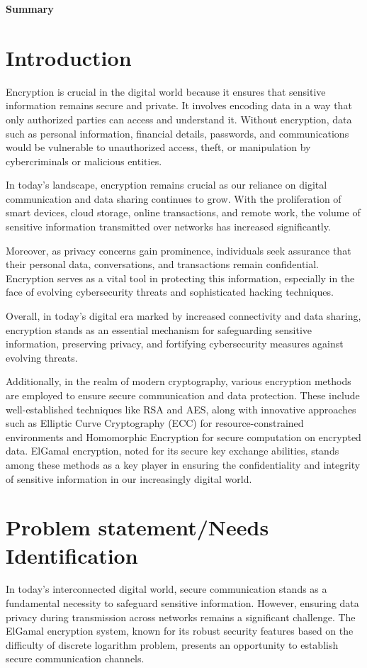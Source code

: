 \documentclass[12pt]{article}
\begin{document}
	\begin{center}
		\textbf{\large{Summary}}
	\end{center}

	\section{Introduction}
Encryption is crucial in the digital world because it ensures that sensitive information remains secure and private. It involves encoding data in a way that only authorized parties can access and understand it. Without encryption, data such as personal information, financial details, passwords, and communications would be vulnerable to unauthorized access, theft, or manipulation by cybercriminals or malicious entities.

In today's landscape, encryption remains crucial as our reliance on digital communication and data sharing continues to grow. With the proliferation of smart devices, cloud storage, online transactions, and remote work, the volume of sensitive information transmitted over networks has increased significantly.

Moreover, as privacy concerns gain prominence, individuals seek assurance that their personal data, conversations, and transactions remain confidential. Encryption serves as a vital tool in protecting this information, especially in the face of evolving cybersecurity threats and sophisticated hacking techniques.

Overall, in today's digital era marked by increased connectivity and data sharing, encryption stands as an essential mechanism for safeguarding sensitive information, preserving privacy, and fortifying cybersecurity measures against evolving threats.

Additionally, in the realm of modern cryptography, various encryption methods are employed to ensure secure communication and data protection. These include well-established techniques like RSA and AES, along with innovative approaches such as Elliptic Curve Cryptography (ECC) for resource-constrained environments and Homomorphic Encryption for secure computation on encrypted data. ElGamal encryption, noted for its secure key exchange abilities, stands among these methods as a key player in ensuring the confidentiality and integrity of sensitive information in our increasingly digital world.

\vskip 20cm
	\section{Problem statement/Needs Identification}
	In today's interconnected digital world, secure communication stands as a fundamental necessity to safeguard sensitive information. However, ensuring data privacy during transmission across networks remains a significant challenge. The ElGamal encryption system, known for its robust security features based on the difficulty of discrete logarithm problem, presents an opportunity to establish secure communication channels.
		
\end{document}
